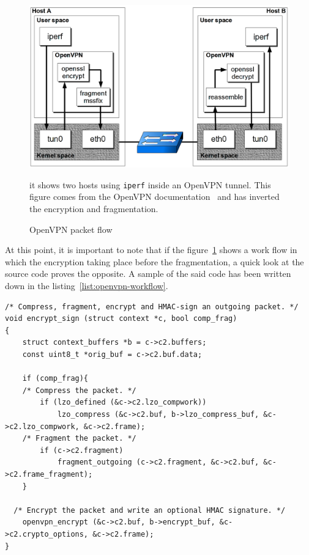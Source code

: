 \begin{figure}[ht]
\includegraphics[width=\textwidth]{OpenVPN-packetflow}
\caption{OpenVPN packet flow}{it shows two hosts using \texttt{iperf} inside an OpenVPN tunnel. This figure comes from the OpenVPN documentation~\cite{openvpn-doc-workflow} and has inverted the encryption and fragmentation.}
\label{fig:openvpn-packet-flow}
\end{figure}

\noindent At this point, it is important to note that if the figure~\ref{fig:openvpn-packet-flow} shows a work flow in which the encryption taking place before the fragmentation, a quick look at the source code proves the opposite.
A sample of the said code has been written down in the listing~\ref{list:openvpn-workflow}.


\lstset{language=c}
\begin{lstlisting}[caption={openvpn compress then encrypt -- sample from \texttt{forward.c}. It clearly shows that the order of operations in the packet work flow is compression, then fragmentation and finally encryption.}, label=list:openvpn-workflow, float]% The 'float' option makes the listing unbreakable.
/* Compress, fragment, encrypt and HMAC-sign an outgoing packet. */
void encrypt_sign (struct context *c, bool comp_frag)
{
	struct context_buffers *b = c->c2.buffers;
	const uint8_t *orig_buf = c->c2.buf.data;

	if (comp_frag){
	/* Compress the packet. */
		if (lzo_defined (&c->c2.lzo_compwork))
			lzo_compress (&c->c2.buf, b->lzo_compress_buf, &c->c2.lzo_compwork, &c->c2.frame);
	/* Fragment the packet. */
		if (c->c2.fragment)
			fragment_outgoing (c->c2.fragment, &c->c2.buf, &c->c2.frame_fragment);
	}

  /* Encrypt the packet and write an optional HMAC signature. */
	openvpn_encrypt (&c->c2.buf, b->encrypt_buf, &c->c2.crypto_options, &c->c2.frame);
}
\end{lstlisting}

